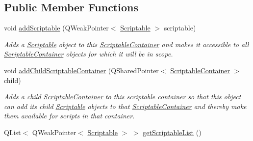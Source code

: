 \subsection*{Public Member Functions}
\begin{DoxyCompactItemize}
\item 
void \hyperlink{class_picto_1_1_scriptable_container_ab8b4c61dbb0dc6724544a6607efa93e6}{add\-Scriptable} (Q\-Weak\-Pointer$<$ \hyperlink{class_picto_1_1_scriptable}{Scriptable} $>$ scriptable)
\begin{DoxyCompactList}\small\item\em Adds a \hyperlink{class_picto_1_1_scriptable}{Scriptable} object to this \hyperlink{class_picto_1_1_scriptable_container}{Scriptable\-Container} and makes it accessible to all \hyperlink{class_picto_1_1_scriptable_container}{Scriptable\-Container} objects for which it will be in scope. \end{DoxyCompactList}\item 
void \hyperlink{class_picto_1_1_scriptable_container_a2242d9ab9446dc8001d74670b19f2125}{add\-Child\-Scriptable\-Container} (Q\-Shared\-Pointer$<$ \hyperlink{class_picto_1_1_scriptable_container}{Scriptable\-Container} $>$ child)
\begin{DoxyCompactList}\small\item\em Adds a child \hyperlink{class_picto_1_1_scriptable_container}{Scriptable\-Container} to this scriptable container so that this object can add its child \hyperlink{class_picto_1_1_scriptable}{Scriptable} objects to that \hyperlink{class_picto_1_1_scriptable_container}{Scriptable\-Container} and thereby make them available for scripts in that container. \end{DoxyCompactList}\item 
\hypertarget{class_picto_1_1_scriptable_container_a2e9c8299a790e10d294c12ab1f6267c6}{Q\-List$<$ Q\-Weak\-Pointer$<$ \hyperlink{class_picto_1_1_scriptable}{Scriptable} $>$ $>$ \hyperlink{class_picto_1_1_scriptable_container_a2e9c8299a790e10d294c12ab1f6267c6}{get\-Scriptable\-List} ()}\label{class_picto_1_1_scriptable_container_a2e9c8299a790e10d294c12ab1f6267c6}


\end{DoxyCompactItemize}
